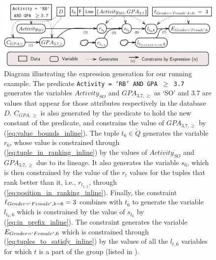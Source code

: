 \begin{figure}[h]
    \centering
    \includegraphics[width=0.75\linewidth]{figures/example_summary.png}
    \caption{Diagram illustrating the expression generation for our running example. The predicate {\tt Activity = `RB' AND GPA $\geq$ 3.7} generates the variables $Activity_{SO}$ and $GPA_{3.7, \geq}$ as `SO' and $3.7$ are values that appear for those attributes respectively in the database $D$. $C_{GPA, \geq}$ is also generated by the predicate to hold the new constant of the predicate, and constrains the value of $GPA_{3.7, \geq}$ by (\ref{eq:value_bounds_inline}). The tuple $t_6\in \widetilde{Q}$ generates the variable $r_6$, whose value is constrained through (\ref{eq:tuple_in_ranking_inline}) by the values of $Activity_{SO}$ and $GPA_{3.7, \geq}$ due to its lineage. It also generates the variable $s_6$, which is then constrained by the value of the $r_t$ values for the tuples that rank better than it, i.e., $r_{t_{1..5}}$, through (\ref{eq:position_in_ranking_inline}). Finally, the constraint $\ell_{Gender=`Female', k=6} = 3$ combines with $t_6$ to generate the variable $l_{t_{6},6}$ which is constrained by the value of $s_{t_6}$ by (\ref{eq:in_prefix_inline}). The constraint generates the variable $E_{Gender=`Female',6}$ which is constrained through (\ref{eq:tuples_to_satisfy_inline}) by the values of all the $l_{t, 6}$ variables for which $t$ is a part of the group (listed in ).}
    \label{fig:example_summary}
    \vspace{-0.5cm}
\end{figure}


    


